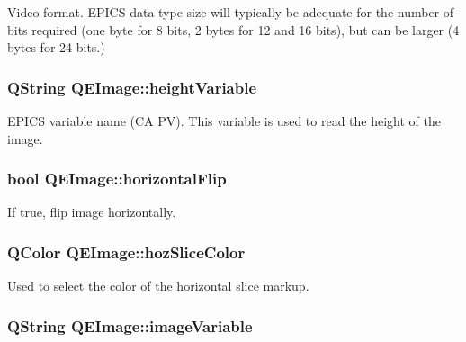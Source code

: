 \label{classQEImage_a6573f94a03c74c8356404e712055d762}
Video format. EPICS data type size will typically be adequate for the number of bits required (one byte for 8 bits, 2 bytes for 12 and 16 bits), but can be larger (4 bytes for 24 bits.) \hypertarget{classQEImage_ac8296f0fa0743fb5284ec70028af7310}{
\subsubsection[{heightVariable}]{\setlength{\rightskip}{0pt plus 5cm}QString QEImage::heightVariable}}
\label{classQEImage_ac8296f0fa0743fb5284ec70028af7310}
EPICS variable name (CA PV). This variable is used to read the height of the image. \hypertarget{classQEImage_a7d9073921f69d33b64c48c273a98ef31}{
\subsubsection[{horizontalFlip}]{\setlength{\rightskip}{0pt plus 5cm}bool QEImage::horizontalFlip}}
\label{classQEImage_a7d9073921f69d33b64c48c273a98ef31}
If true, flip image horizontally. \hypertarget{classQEImage_a9e69a916b1c656c1be7bc07727294756}{
\subsubsection[{hozSliceColor}]{\setlength{\rightskip}{0pt plus 5cm}QColor QEImage::hozSliceColor}}
\label{classQEImage_a9e69a916b1c656c1be7bc07727294756}
Used to select the color of the horizontal slice markup. \hypertarget{classQEImage_a4387f3f14b3384ce8f48400047aa70d1}{
\subsubsection[{imageVariable}]{\setlength{\rightskip}{0pt plus 5cm}QString QEImage::imageVariable}}
